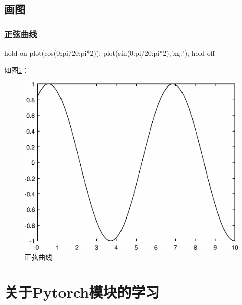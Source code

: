 \documentclass{article}
\begin{document}
	\subsection{画图}
	\subsubsection{正弦曲线}
	\begin{python}
		hold on
		plot(cos(0:pi/20:pi*2));
		plot(sin(0:pi/20:pi*2),'xg:');
		hold off
	\end{python}

	如图\ref{fig1}：
	
	\begin{figure}[h]
		\centering
		\includegraphics{plot1.ps}
		\caption{正弦曲线}\label{fig1}
	\end{figure}
	\section{关于Pytorch模块的学习}
\end{document}
